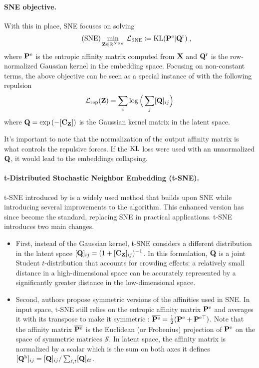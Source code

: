 \paragraph{SNE objective.}
With this in place, SNE focuses on solving
\begin{align}\label{eq:SNE_pb}\tag{SNE}
    \min_{{\mathbf{Z}} \in \mathbb{R}^{N \times d}} \: \mathcal{L}_{\mathrm{SNE}} \coloneqq \operatorname{KL}({\mathbf{P}}^{\mathrm{e}} | {\mathbf{Q}}^{\mathrm{r}}) \;,
\end{align}
where ${\mathbf{P}}^{\mathrm{e}}$ is the entropic affinity matrix computed from ${\mathbf{X}}$ and ${\mathbf{Q}}^{\mathrm{r}}$ is the row-normalized Gaussian kernel in the embedding space.
Focusing on non-constant terms, the above objective can be seen as a special instance of  with the following repulsion
\begin{align}
    \mathcal{L}_{\mathrm{rep}}({\mathbf{Z}}) = \sum_{i} \log \Big(\sum_j [{\mathbf{Q}}]_{ij} \Big)
\end{align}
where ${\mathbf{Q}} = \exp{(-[{\mathbf{C}}_{{\mathbf{Z}}}])}$ is the Gaussian kernel matrix in the latent space.

\begin{remark}\label{rem:norm_as_repulsion}
    It's important to note that the normalization of the output affinity matrix is what controls the repulsive forces. If the $\operatorname{KL}$ loss were used with an unnormalized ${\mathbf{Q}}$, it would lead to the embeddings collapsing.
\end{remark}

\paragraph{t-Distributed Stochastic Neighbor Embedding (t-SNE).} t-SNE introduced by \citet{van2008visualizing} is a widely used method that builds upon SNE while introducing several improvements to the algorithm. This enhanced version has since become the standard, replacing SNE in practical applications. t-SNE introduces two main changes. 
\begin{itemize}
    \item First, instead of the Gaussian kernel, t-SNE considers a different distribution in the latent space $[{\mathbf{Q}}]_{ij} = (1 + [\mathbf{C}_{\mathbf{Z}}]_{ij})^{-1}$. In this formulation, ${\mathbf{Q}}$ is a joint Student $t$-distribution that accounts for crowding effects: a relatively small
    distance in a high-dimensional space can be accurately represented by a
    significantly greater distance in the low-dimensional space. 
    \item Second, authors propose symmetric versions of the affinities used in SNE. In input space, t-SNE still relies on the entropic affinity matrix ${\mathbf{P}}^{\mathrm{e}}$ and averages it with its transpose to make it symmetric : $\overline{{\mathbf{P}}^{\mathrm{e}}} = \frac{1}{2}({\mathbf{P}}^{\mathrm{e}} + {\mathbf{P}}^{\mathrm{e} \top})$. Note that the affinity matrix $\overline{{\mathbf{P}}^{\mathrm{e}}}$ is the Euclidean (or Frobenius) projection of ${\mathbf{P}}^{\mathrm{e}}$ on the space of symmetric matrices $\mathcal{S}$. In latent space, the affinity matrix is normalized by a scalar which is the sum on both axes \ie it defines $[{\mathbf{Q}}^{\mathrm{b}}]_{ij} = [{\mathbf{Q}}]_{ij} /\sum_{\ell,t}[{\mathbf{Q}}]_{\ell t}$.
\end{itemize}

